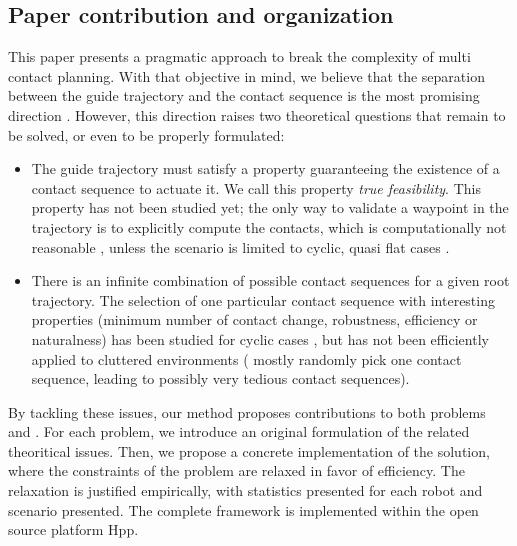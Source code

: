 \subsection{Paper contribution and organization}
This paper presents a pragmatic approach to break the complexity of multi contact planning. With that objective in mind,
we believe that the separation between the guide trajectory and the contact sequence is the most promising direction \citep{DBLP:conf/iser/EscandeKMG08}.
However, this direction raises two theoretical questions that remain to be solved, or even to be properly formulated:
\begin{itemize}
\item The guide trajectory must satisfy a property guaranteeing the existence of a contact sequence to actuate it. We call this property \textit{true feasibility}. This property has not been studied yet; the only way to validate a waypoint in the trajectory is to explicitly compute the contacts, which is computationally not reasonable \citep{Bouyarmane2009}, unless the scenario is limited to cyclic, quasi flat cases \citep{zucker2010optimization}.
\item There is an infinite combination of possible contact sequences for a given root trajectory. The selection of one particular contact sequence with interesting properties (minimum number of contact change, robustness, efficiency or naturalness) has been studied for cyclic cases \citep{Hauser06usingmotion}, but has not been efficiently applied to cluttered environments (\citeauthor{bouyarmane:lirmm-00777727, DBLP:conf/iser/EscandeKMG08} mostly randomly pick one contact sequence, leading to possibly very tedious contact sequences).
\end{itemize}

By tackling these issues, our method proposes contributions to both problems \Pa and \Pb.
For each problem, we introduce an original formulation of the related theoritical issues.
Then, we propose a concrete implementation of the solution, where the constraints of the problem are relaxed in favor of efficiency.
The relaxation is justified empirically, with statistics presented for each robot and scenario presented. The complete framework is implemented within
the open source platform Hpp.

